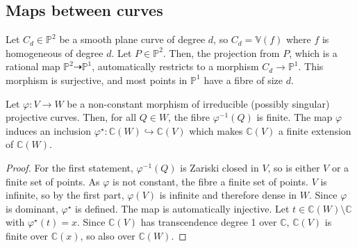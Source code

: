 \subsection{Maps between curves}
\begin{example}
    Let \( C_d \in \mathbb P^2 \) be a smooth plane curve of degree \( d \), so \( C_d = \mathbb V(f) \) where \( f \) is homogeneous of degree \( d \).
    Let \( P \in \mathbb P^2 \).
    Then, the projection from \( P \), which is a rational map \( \mathbb P^2 \dashrightarrow \mathbb P^1 \), automatically restricts to a morphism \( C_d \to \mathbb P^1 \).
    This morphism is surjective, and most points in \( \mathbb P^1 \) have a fibre of size \( d \).
\end{example}
\begin{proposition}
    Let \( \varphi \colon V \to W \) be a non-constant morphism of irreducible (possibly singular) projective curves.
    Then, for all \( Q \in W \), the fibre \( \varphi^{-1}(Q) \) is finite.
    The map \( \varphi \) induces an inclusion \( \varphi^\star \colon \mathbb C(W) \hookrightarrow \mathbb C(V) \) which makes \( \mathbb C(V) \) a finite extension of \( \mathbb C(W) \).
\end{proposition}
\begin{proof}
    For the first statement, \( \varphi^{-1}(Q) \) is Zariski closed in \( V \), so is either \( V \) or a finite set of points.
    As \( \varphi \) is not constant, the fibre a finite set of points.
    \( V \) is infinite, so by the first part, \( \varphi(V) \) is infinite and therefore dense in \( W \).
    Since \( \varphi \) is dominant, \( \varphi^\star \) is defined.
    The map is automatically injective.
    Let \( t \in \mathbb C(W) \setminus \mathbb C \) with \( \varphi^\star(t) = x \).
    Since \( \mathbb C(V) \) has transcendence degree 1 over \( \mathbb C \), \( \mathbb C(V) \) is finite over \( \mathbb C(x) \), so also over \( \mathbb C(W) \).
\end{proof}

